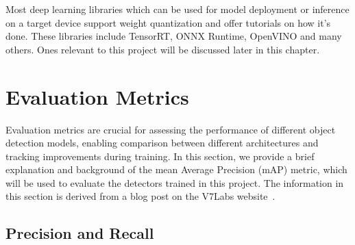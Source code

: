 


Most deep learning libraries which can be used for model deployment or inference
on a target device support weight quantization and offer tutorials on how it's
done. These libraries include TensorRT, ONNX Runtime, OpenVINO and many others.
Ones relevant to this project will be discussed later in this chapter.



\section{Evaluation Metrics}
\label{EvaluationMetrics}

Evaluation metrics are crucial for assessing the performance of different object
detection models, enabling comparison between different architectures and
tracking improvements during training. In this section, we provide a brief
explanation and background of the mean Average Precision (mAP) metric, which
will be used to evaluate the detectors trained in this project. The information
in this section is derived from a blog post on the V7Labs website~\cite{mAP}.

\subsection*{Precision and Recall}

